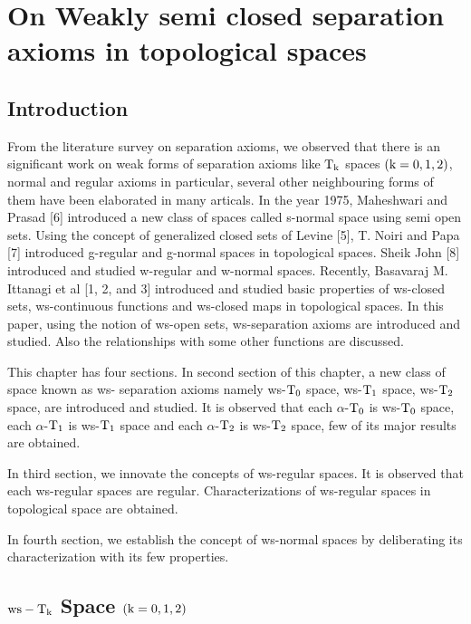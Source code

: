 \chapter{On Weakly semi closed separation axioms in topological spaces}
\graphicspath{{Chapter8/Chapter8Figs/EPS/}{Chapter8/Chapter8Figs/}}

\section{Introduction}\label{sec8.1}


From the literature survey on separation axioms, we observed that there is an significant work on weak forms of separation axioms like $\mathrm{T}_{\mathrm{k}}$ spaces $(\mathrm{k}=0, 1, 2)$, normal and regular axioms in particular, several other neighbouring forms of them have been elaborated in many articals. In the year 1975, Maheshwari and Prasad [6] introduced a new class of spaces called s-normal space using semi open sets. Using the concept of generalized closed sets of Levine [5], T. Noiri and Papa [7] introduced g-regular and g-normal spaces in topological spaces. Sheik John [8] introduced and studied w-regular and w-normal spaces. Recently, Basavaraj M. Ittanagi et al [1, 2, and 3] introduced and studied basic properties of ws-closed sets, ws-continuous functions and ws-closed maps in topological spaces. In this paper, using the notion of ws-open sets, ws-separation axioms are introduced and studied. Also the relationships with some other functions are discussed.

This chapter has four sections. In second section of this chapter, a new class of space known as ws- separation axioms namely ws-$\mathrm{T}_{0}$ space, ws-$\mathrm{T}_{1}$ space, ws-$\mathrm{T}_{2}$ space, are introduced and studied. It is observed that each $\alpha$-$\mathrm{T}_{0}$ is ws-$\mathrm{T}_{0}$ space, each $\alpha$-$\mathrm{T}_{1}$ is ws-$\mathrm{T}_{1}$ space and each $\alpha$-$\mathrm{T}_{2}$ is ws-$\mathrm{T}_{2}$ space, few of its major results are obtained.

\newpage

In third section, we innovate the concepts of ws-regular spaces. It is observed that each ws-regular spaces are regular. Characterizations of ws-regular spaces in topological space are obtained.

In fourth section, we establish the concept of ws-normal spaces by deliberating its characterization with its few properties.

\section{\boldmath$\mathrm{ws}-\mathrm{T}_{\mathrm{k}}$ Space $(\mathrm{k}=0,1,2)$}\label{sec8.2}

